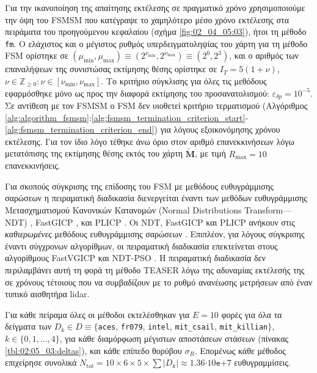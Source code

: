 Για την ικανοποίηση της απαίτησης εκτέλεσης σε πραγματικό χρόνο χρησιμοποιούμε
την όψη του FSMSM που κατέγραψε το χαμηλότερο μέσο χρόνο εκτέλεσης στα
πειράματα του προηγούμενου κεφαλαίου (σχήμα \ref{fig:02_04_05:03}), ήτοι τη
μέθοδο \texttt{fm}.  Ο ελάχιστος και ο μέγιστος ρυθμός υπερδειγματοληψίας του
χάρτη για τη μέθοδο FSM ορίστηκε σε $(\mu_{\min},\mu_{\max}) \equiv
(2^{\nu_{\min}},2^{\nu_{\max}}) \equiv (2^0,2^3)$, και ο αριθμός των
επαναλήψεων της συνιστώσας εκτίμησης θέσης ορίστηκε σε $I_T=5(1+\nu)$, $\nu \in
\mathbb{Z}_{\geq 0}: \nu \in [\nu_{\min}, \nu_{\max}]$. Το κριτήριο σύγκλισης
για όλες τις μεθόδους εφαρμόσθηκε μόνο ως προς την διαφορά εκτίμησης του
προσανατολισμού: $\varepsilon_{\delta p} = 10^{-5}$. Σε αντίθεση με τον FSMSM ο
FSM δεν υιοθετεί κριτήριο τερματισμού (Αλγόριθμος
\ref{alg:algorithm_fsmsm}:\ref{alg:fsmsm_termination_criterion_start}-\ref{alg:fsmsm_termination_criterion_end})
για λόγους εξοικονόμησης χρόνου εκτέλεσης. Για τον ίδιο λόγο τέθηκε άνω όριο
στον αριθμό επανεκκινήσεων λόγω μετατόπισης της εκτίμησης θέσης εκτός του χάρτη
$\widetilde{\bm{M}}$, με τιμή $R_{\max} = 10$ επανεκκινήσεις.

Για σκοπούς σύγκρισης της επίδοσης του FSM με μεθόδους ευθυγράμμισης σαρώσεων η
πειραματική διαδικασία διενεργείται έναντι των μεθόδων ευθυγράμμισης
Μετασχηματισμού Κανονικών Κατανομών (Normal Distributions Transform---NDT)
\cite{Bibera,ndt_code}, FastGICP \cite{Segal2009a,fgicp_code}, και PLICP
\cite{Censi2008a,plicp_code}. Οι NDT, FastGICP και PLICP ανήκουν στις
\textit{καθιερωμένες} μεθόδους ευθυγράμμισης σαρώσεων
\cite{Koide2021a,Xu2018b,Sobreira2019b,Pishehvari2019b,Qingshan2019c,Pham2021b}.
Επιπλέον, για λόγους σύγκρισης έναντι σύγχρονων αλγορίθμων, οι πειραματική
διαδικασία επεκτείνεται στους αλγορίθμους FastVGICP
\cite{Koide2021a,fgicp_code} και NDT-PSO \cite{Bouraine2021,ndt_pso_code}. Η
πειραματική διαδικασία δεν περιλαμβάνει αυτή τη φορά τη μέθοδο TEASER λόγω της
αδυναμίας εκτέλεσής της σε χρόνους τέτοιους που να συμβαδίζουν με το ρυθμό
ανανέωσης μετρήσεων από έναν τυπικό αισθητήρα lidar.

Για κάθε πείραμα όλες οι μέθοδοι εκτελέσθηκαν για $E = 10$ φορές για όλα τα
δείγματα των $D_k \in D \equiv \{$\texttt{aces}, \texttt{fr079},
\texttt{intel}, \texttt{mit\_csail}, \texttt{mit\_killian}$\}$, $k \in
\{0,1,\dots,4\}$, για κάθε διαμόρφωση μέγιστων αποστάσεων στάσεων (πίνακας
\ref{tbl:02:05_03:deltas}), και κάθε επίπεδο θορύβου $\sigma_R$.  Επομένως κάθε
μέθοδος επιχείρησε συνολικά $N_{tot} = 10 \times 6 \times 5 \times \sum
|D_k|\approx 1.36$$\cdot10$$\texttt{e}$$+$$7$ ευθυγραμμίσεις.


